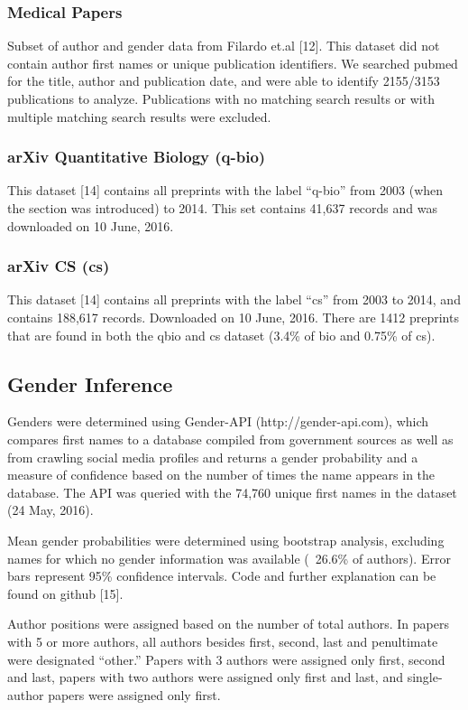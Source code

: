 \documentclass[10pt,letterpaper]{article}
\begin{document}
\begin{flushleft}
\subsubsection*{Medical Papers}
Subset of author and gender data from Filardo et.al [12]. This dataset did not contain author first names or unique publication identifiers. We searched pubmed for the title, author and publication date, and were able to identify 2155/3153 publications to analyze. Publications with no matching search results or with multiple matching search results were excluded.

\subsubsection*{arXiv Quantitative Biology (q-bio)}
This dataset [14] contains all preprints with the label “q-bio” from 2003 (when the section was introduced) to 2014. This set contains 41,637 records and was downloaded on 10 June, 2016.

\subsubsection*{arXiv CS (cs)}
This dataset [14] contains all preprints with the label “cs” from 2003 to 2014, and contains 188,617 records. Downloaded on 10 June, 2016. There are 1412 preprints that are found in both the qbio and cs dataset (3.4\% of bio and 0.75\% of cs).

\subsection*{Gender Inference}
Genders were determined using Gender-API (http://gender-api.com), which compares first names to a database compiled from government sources as well as from crawling social media profiles and returns a gender probability and a measure of confidence based on the number of times the name appears in the database. The API was queried with the 74,760 unique first names in the dataset (24 May, 2016).

Mean gender probabilities were determined using bootstrap analysis, excluding names for which no gender information was available (~26.6\% of authors). Error bars represent 95\% confidence intervals. Code and further explanation can be found on github [15].

Author positions were assigned based on the number of total authors. In papers with 5 or more authors, all authors besides first, second, last and penultimate were designated “other.” Papers with 3 authors were assigned only first, second and last, papers with two authors were assigned only first and last, and single-author papers were assigned only first.


\end{flushleft}
\end{document}

